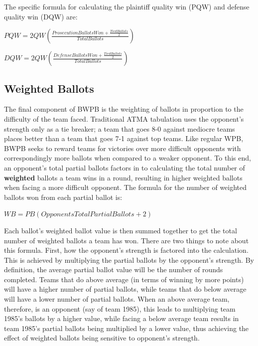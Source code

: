 \documentclass{article}
\begin{document}
The specific formula for calculating the plaintiff quality win (PQW) and defense quality win (DQW) are:
\begin{center}
$PQW=2QW\left(\frac{ProsecutionBallotsWon+\frac{TiedBallots}{2}}{TotalBallots}\right)$

$DQW=2QW\left(\frac{DefenseBallotsWon+\frac{TiedBallots}{2}}{TotalBallots}\right)$
\end{center}

\subsection{Weighted Ballots}
The final component of BWPB is the weighting of ballots in proportion to the difficulty of the team faced.  Traditional ATMA tabulation uses the opponent's strength only as a tie breaker; a team that goes 8-0 against mediocre teams places better than a team that goes 7-1 against top teams.  Like regular WPB, BWPB seeks to reward teams for victories over more difficult opponents with correspondingly more ballots when compared to a weaker opponent.  To this end, an opponent's total partial ballots factors in to calculating the total number of \textbf{weighted} ballots a team wins in a round, resulting in higher weighted ballots when facing a more difficult opponent.  The formula for the number of weighted ballots won from each partial ballot is:
\begin{center}
$WB=PB\left(OpponentsTotalPartialBallots+2\right)$
\end{center}

Each ballot's weighted ballot value is then summed together to get the total number of weighted ballots a team has won.  There are two things to note about this formula.  First, how the opponent's strength is factored into the calculation.  This is achieved by multiplying the partial ballots by the opponent's strength.  By definition, the average partial ballot value will be the number of rounds completed.  Teams that do above average (in terms of winning by more points) will have a higher number of partial ballots, while teams that do below average will have a lower number of partial ballots.  When an above average team, therefore, is an opponent (say of team 1985), this leads to multiplying team 1985's ballots by a higher value, while facing a below average team results in team 1985's partial ballots being multiplied by a lower value, thus achieving the effect of weighted ballots being sensitive to opponent's strength.
\end{document}

